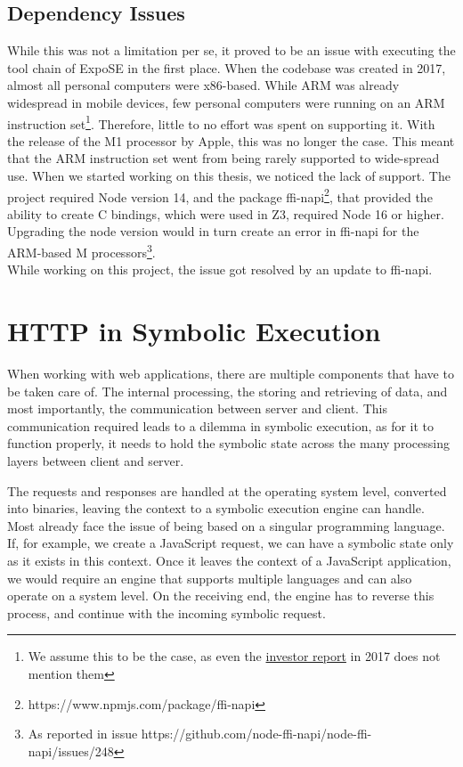 \subsection{Dependency Issues}
\label{sec:dep-issues}
While this was not a limitation per se, it proved to be an issue with executing the tool chain of ExpoSE in the first place. When the codebase was created in 2017, almost all personal computers were x86-based. While ARM was already widespread in mobile devices, few personal computers were running on an ARM instruction set\footnote{We assume this to be the case, as even the \href{https://www.arm.com/-/media/global/company/investors/Arm\%20Strategic\%20Review\%20-\%202017.pdf?revision=8473a535-6f7e-4ce5-85fe-0eb6f1f75487&la=en}{investor report} in 2017 does not mention them}. Therefore, little to no effort was spent on supporting it. 
With the release of the M1 processor by Apple, this was no longer the case.
This meant that the ARM instruction set went from being rarely supported to wide-spread use.
When we started working on this thesis, we noticed the lack of support. The project required Node version 14, and the package ffi-napi\footnote{https://www.npmjs.com/package/ffi-napi}, that provided the ability to create C bindings, which were used in Z3, required Node 16 or higher.
Upgrading the node version would in turn create an error in ffi-napi for the ARM-based M processors\footnote{As reported in issue https://github.com/node-ffi-napi/node-ffi-napi/issues/248}.\\
While working on this project, the issue got resolved by an update to ffi-napi.

\section{HTTP in Symbolic Execution}
\label{sec:http}
When working with web applications, there are multiple components that have to be taken care of. The internal processing, the storing and retrieving of data, and most importantly, the communication between server and client.
This communication required leads to a dilemma in symbolic execution, as for it to function properly, it needs to hold the symbolic state across the many processing layers between client and server. 

The requests and responses are handled at the operating system level, converted into binaries, leaving the context to a symbolic execution engine can handle. Most already face the issue of being based on a singular programming language. If, for example, we create a JavaScript request, we can have a symbolic state only as it exists in this context. Once it leaves the context of a JavaScript application, we would require an engine that supports multiple languages and can also operate on a system level. On the receiving end, the engine has to reverse this process, and continue with the incoming symbolic request.


